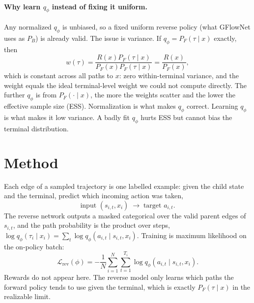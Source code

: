 \documentclass[11pt]{article}
\begin{document}
\paragraph{Why learn $q_\phi$ instead of fixing it uniform.}
Any normalized $q_\phi$ is unbiased, so a fixed uniform reverse policy (what
GFlowNet uses as $P_B$) is already valid. The issue is variance. If
$q_\phi = P_F(\tau \mid x)$ exactly, then
\begin{equation}
w(\tau) = \frac{R(x) P_F(\tau \mid x)}{P_F(x) P_F(\tau \mid x)} = \frac{R(x)}{P_F(x)},
\end{equation}
which is constant across all paths to $x$: zero within-terminal variance, and
the weight equals the ideal terminal-level weight we could not compute
directly. The further $q_\phi$ is from $P_F(\cdot \mid x)$, the more the weights
scatter and the lower the effective sample size (ESS). Normalization is what
makes $q_\phi$ correct. Learning $q_\phi$ is what makes it low variance. A badly
fit $q_\phi$ hurts ESS but cannot bias the terminal distribution.

\section{Method}

Each edge of a sampled trajectory is one labelled example: given the child state
and the terminal, predict which incoming action was taken,
\begin{equation}
\text{input } (s_{i,t}, x_i) \;\longrightarrow\; \text{target } a_{i,t}.
\end{equation}
The reverse network outputs a masked categorical over the valid parent edges of
$s_{i,t}$, and the path probability is the product over steps,
$\log q_\phi(\tau_i \mid x_i) = \sum_t \log q_\phi(a_{i,t} \mid s_{i,t}, x_i)$.
Training is maximum likelihood on the on-policy batch:
\begin{equation}
\mathcal{L}_{\text{rev}}(\phi) = -\frac{1}{N} \sum_{i=1}^{N} \sum_{t=1}^{T_i}
\log q_\phi(a_{i,t} \mid s_{i,t}, x_i).
\label{eq:revloss}
\end{equation}
Rewards do not appear here. The reverse model only learns which paths the
forward policy tends to use given the terminal, which is exactly
$P_F(\tau \mid x)$ in the realizable limit.
\end{document}
